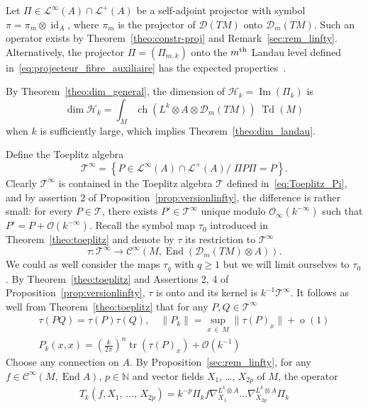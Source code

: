 \documentclass[10pt,a4paper]{article}
\theoremstyle{definition}
\numberwithin{equation}{section}
\newcommand{\N}{{\mathbb{N}}}
\newcommand{\op}{\operatorname}
\newcommand{\Ci}{{\mathcal{C}}^{\infty}}
\newcommand{\bigo}{\mathcal{O}}
\newcommand{\biginf}{\mathcal{O}_{\infty}}
\newcommand{\D}{\mathcal{D}}
\newcommand{\lag}{\mathcal{L}}
\newcommand{\Hilb}{\mathcal{H}}
\newcommand{\clT}{\mathcal{T}}
\begin{document}
Let $\Pi \in \lag^{\infty}(A) \cap \lag^{+} (A)$ be a self-adjoint projector with symbol $\pi= \pi_m \otimes \op{id}_A$, where $\pi_m$ is the projector of $\D (TM)$ onto $\D_m (TM)$. Such an operator exists by Theorem~\ref{theo:constr-proj} and Remark~\ref{sec:rem_linfty}. Alternatively, the projector $\Pi = (\Pi_{m,k})$ onto the $m^{\rm th}$ Landau level defined in~\eqref{eq:projecteur_fibre_auxiliaire} has the expected properties~\cite[Theorems~5.2, 5.3]{oim_copain}.

By Theorem~\ref{theo:dim_general}, the dimension of $\Hilb_k= \op{Im}(\Pi_k)$ is
\[
\op{dim} \Hilb_k = \int_M \op{ch} \left(L^k \otimes A \otimes \D_m(TM)\right) \; \op{Td}
(M)
\]
when $k$ is sufficiently large, which implies Theorem~\ref{theo:dim_landau}.

Define the Toeplitz algebra
\[
\clT^{\infty} = \left\{ P \in \lag^{\infty}(A) \cap \lag^{+}
(A)/\; \Pi P \Pi = P \right\}.
\]
Clearly $\clT^{\infty}$ is contained in the Toeplitz algebra $\clT$ defined in~\eqref{eq:Toeplitz_Pi}, and by assertion 2 of Proposition~\ref{prop:versionlinfty}, the difference is rather small: for every $ P \in
\clT$, there exists $P' \in \clT^{\infty}$ unique modulo $\biginf (k^{-\infty})$ such that $P' = P + \bigo (k^{-\infty})$. Recall the symbol map $\tau_0$ introduced in Theorem~\ref{theo:toeplitz} and denote by $\tau$ its restriction to $\clT^{\infty}$
\[
\tau : \clT^{\infty} \rightarrow \Ci (M, \op{End} (\D_m (TM) \otimes A))
.
\]
We could as well consider the maps $\tau_q$ with $q \geqslant 1$ but we will limit ourselves to $\tau_0$. By Theorem~\ref{theo:toeplitz} and Assertions 2, 4 of Proposition~\ref{prop:versionlinfty}, $\tau$ is onto and its kernel is $k^{-1}
\clT^{\infty}$. It follows as well from Theorem~\ref{theo:toeplitz} that for any $P,Q \in \clT^{\infty}$
\begin{gather*}
\tau (PQ) = \tau (P) \tau (Q), \quad \| P_k \| = \sup_{x\, \in\,M} \|
\tau(P)_x\| + \op{o} (1) \\
P_k (x,x) = \left(\frac{k}{2\pi} \right)^n \op{tr} (\tau (P)_x) + \bigo \left(k^{-1}\right)
\end{gather*}
Choose any connection on $A$. By Proposition~\ref{sec:rem_linfty}, for any $ f \in \Ci (M, \op{End} A)$, $p \in \N$ and vector fields $X_1$, \ldots, $X_{2p}$ of $M$, the operator
\begin{gather}\label{eq:toeplitz_mult_der}
T_k \left(f, X_1,\, \ldots,\, X_{2p}\right) = k^{-p} \Pi_k f \nabla_{X_1}^{L^k \otimes A}
\ldots \nabla_{X_{2p}}^{L^k \otimes A}
\Pi_k
\end{gather}
\end{document}
